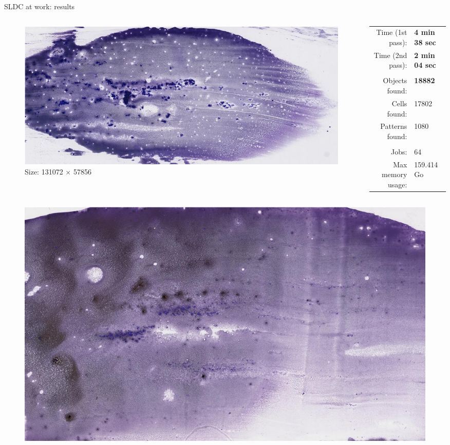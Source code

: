 \documentclass{beamer}
\begin{document}
\begin{frame}{SLDC at work: results}
	\footnotesize
	\vspace*{-0.2cm}
	\begin{columns}
		\begin{column}{0.40\linewidth}
			\begin{figure}
				\center
				\includegraphics[scale=0.2]{images/728725.png}
				\caption{Size: 131072 $\times$ 57856}
			\end{figure}
		\end{column}
		\begin{column}{0.47\linewidth}
			\begin{tabular}{rl}
				Time (1st pass): & \textbf{4 min 38 sec} \\
				Time (2nd pass): & \textbf{2 min 04 sec}  \\
				& \\
				Objects found: & \textbf{18882} \\
				Cells found: & 17802 \\
				Patterns found: & 1080 \\
				& \\
				Jobs: & 64 \\
				Max memory usage: & 159.414 Go \\
			\end{tabular}
		\end{column}
	\end{columns}
	\begin{columns}
		\begin{column}{0.40\linewidth}
			\begin{figure}
				\center
				\includegraphics[scale=0.16]{images/716528.png}

\end{figure}
\end{column}
\end{columns}
\end{frame}
\end{document}
